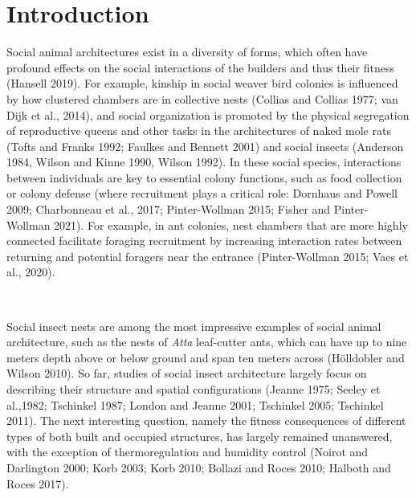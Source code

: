 \documentclass[3p]{elsarticle} %
\begin{document}
\newpage

\hypertarget{introduction}{%
\section{Introduction}\label{introduction}}

Social animal architectures exist in a diversity of forms, which often
have profound effects on the social interactions of the builders and
thus their fitness (Hansell 2019). For example, kinship in social weaver
bird colonies is influenced by how clustered chambers are in collective
nests (Collias and Collias 1977; van Dijk et al., 2014), and social
organization is promoted by the physical segregation of reproductive
queens and other tasks in the architectures of naked mole rats (Tofts
and Franks 1992; Faulkes and Bennett 2001) and social insects (Anderson
1984, Wilson and Kinne 1990, Wilson 1992). In these social species,
interactions between individuals are key to essential colony functions,
such as food collection or colony defense (where recruitment plays a
critical role: Dornhaus and Powell 2009; Charbonneau et al., 2017;
Pinter-Wollman 2015; Fisher and Pinter-Wollman 2021). For example, in
ant colonies, nest chambers that are more highly connected facilitate
foraging recruitment by increasing interaction rates between returning
and potential foragers near the entrance (Pinter-Wollman 2015; Vaes et
al., 2020).

~

Social insect nests are among the most impressive examples of social
animal architecture, such as the nests of \emph{Atta} leaf-cutter ants,
which can have up to nine meters depth above or below ground and span
ten meters across (Hölldobler and Wilson 2010). So far, studies of
social insect architecture largely focus on describing their structure
and spatial configurations (Jeanne 1975; Seeley et al.,1982; Tschinkel
1987; London and Jeanne 2001; Tschinkel 2005; Tschinkel 2011). The next
interesting question, namely the fitness consequences of different types
of both built and occupied structures, has largely remained unanswered,
with the exception of thermoregulation and humidity control (Noirot and
Darlington 2000; Korb 2003; Korb 2010; Bollazi and Roces 2010; Halboth
and Roces 2017).

~
\end{document}
